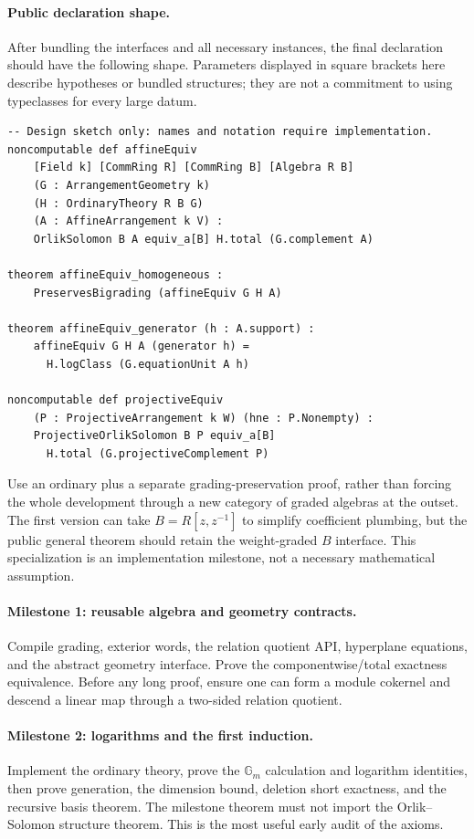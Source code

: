 \documentclass[11pt]{article}
\newcommand{\Gm}{{\mathbb G_m}}
\newcommand{\planned}[1]{\texttt{\detokenize{#1}}}
\theoremstyle{definition}
\theoremstyle{remark}
\begin{document}
\paragraph{Public declaration shape.}
After bundling the interfaces and all necessary instances, the final declaration should have the following shape. Parameters displayed in square brackets here describe hypotheses or bundled structures; they are not a commitment to using typeclasses for every large datum.
\begin{lstlisting}
-- Design sketch only: names and notation require implementation.
noncomputable def affineEquiv
    [Field k] [CommRing R] [CommRing B] [Algebra R B]
    (G : ArrangementGeometry k)
    (H : OrdinaryTheory R B G)
    (A : AffineArrangement k V) :
    OrlikSolomon B A equiv_a[B] H.total (G.complement A)

theorem affineEquiv_homogeneous :
    PreservesBigrading (affineEquiv G H A)

theorem affineEquiv_generator (h : A.support) :
    affineEquiv G H A (generator h) =
      H.logClass (G.equationUnit A h)

noncomputable def projectiveEquiv
    (P : ProjectiveArrangement k W) (hne : P.Nonempty) :
    ProjectiveOrlikSolomon B P equiv_a[B]
      H.total (G.projectiveComplement P)
\end{lstlisting}

Use an ordinary \planned{AlgEquiv} plus a separate grading-preservation proof, rather than forcing the whole development through a new category of graded algebras at the outset. The first version can take $B=R[z,z^{-1}]$ to simplify coefficient plumbing, but the public general theorem should retain the weight-graded $B$ interface. This specialization is an implementation milestone, not a necessary mathematical assumption.

\paragraph{Milestone 1: reusable algebra and geometry contracts.}
Compile grading, exterior words, the relation quotient API, hyperplane equations, and the abstract geometry interface. Prove the componentwise/total exactness equivalence. Before any long proof, ensure one can form a module cokernel and descend a linear map through a two-sided relation quotient.

\paragraph{Milestone 2: logarithms and the first induction.}
Implement the ordinary theory, prove the $\Gm$ calculation and logarithm identities, then prove generation, the dimension bound, deletion short exactness, and the recursive basis theorem. The milestone theorem must not import the Orlik--Solomon structure theorem. This is the most useful early audit of the axioms.
\end{document}
